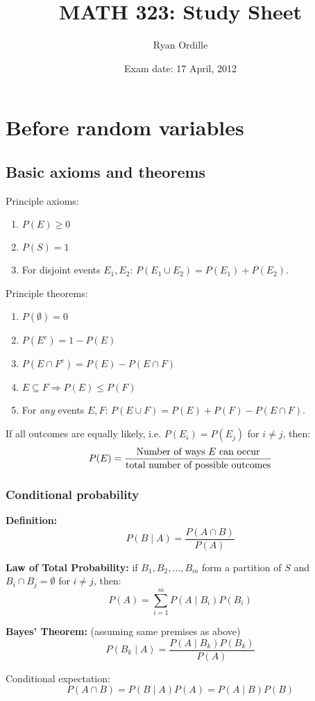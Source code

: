 \documentclass[15pt]{article}
\title{MATH 323: Study Sheet}
\author{Ryan Ordille}
\date{Exam date: 17 April, 2012}
\begin{document}
\maketitle

\section{Before random variables}
\subsection{Basic axioms and theorems}
Principle axioms:
\begin{enumerate}
    \item $P(E) \geq 0$
    \item $P(S) = 1$
    \item For disjoint events $E_1, E_2$: $P(E_1 \cup E_2) = P(E_1) + P(E_2)$.
\end{enumerate}

Principle theorems:
\begin{enumerate}
    \item $P(\emptyset) = 0$
    \item $P(E^c) = 1 - P(E)$
    \item $P(E \cap F^c) = P(E) - P(E \cap F)$
    \item $E \subseteq F \Rightarrow P(E) \leq P(F)$
    \item For \emph{any} events $E,F$: $P(E \cup F) = P(E) + P(F) - P(E \cap F)$.
\end{enumerate}

If all outcomes are equally likely, i.e. $P(E_i) = P(E_j)$ for $i \neq j$, then:
\[
    P(E) = \frac{\textnormal{Number of ways $E$ can occur}}{\text{total number of possible outcomes}}
\]

\subsubsection{Conditional probability}
\textbf{Definition:}
\[
    P(B \; | \; A) = \frac{P(A \cap B)}{P(A)}
\]

\textbf{Law of Total Probability:} if $B_1, B_2, \dots, B_m$ form a partition of $S$ and $B_i \cap B_j = \emptyset$ for $i \neq j$, then:
\[
    P(A) = \sum_{i = 1}^m P(A \; | \; B_i) P(B_i)
\]

\textbf{Bayes' Theorem:} (assuming same premises as above)
\[
    P(B_k \; | \; A) = \frac{P(A \; | \; B_k)P(B_k)}{P(A)}
\]

Conditional expectation:
\[
    P(A \cap B) = P(B \; | \; A) P(A) = P(A \; | \; B) P(B)
\]
\end{document}
